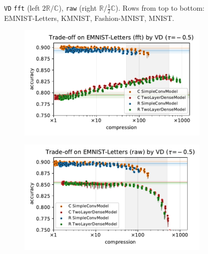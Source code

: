 \documentclass[a4paper,10pt,onecolumn]{article}
\newcommand{\real}{\mathbb{R}}
\newcommand{\cplx}{\mathbb{C}}
\begin{document}
\begin{figure}[b]
\begin{subfigure}[b]{0.5\columnwidth}
  \end{subfigure}
  \caption{%
    \texttt{VD}
      \texttt{fft} (left $2\real / \cplx$), \texttt{raw} (right $\real / \tfrac12\cplx$).
      Rows from top to bottom: EMNIST-Letters, KMNIST, Fashion-MNIST, MNIST.
  }
\end{figure}

\begin{figure}[b]
  \centering
  \begin{subfigure}[b]{0.5\columnwidth}
    \centering
    \includegraphics[width=\columnwidth]{figure__mnist-like__trade-off/appendix__VD__emnist_letters__fft__-0.5.pdf}
  \end{subfigure}%
  \begin{subfigure}[b]{0.5\columnwidth}
    \centering
    \includegraphics[width=\columnwidth]{figure__mnist-like__trade-off/appendix__VD__emnist_letters__raw__-0.5.pdf}
  \end{subfigure} \\%

\end{figure}
\end{document}
